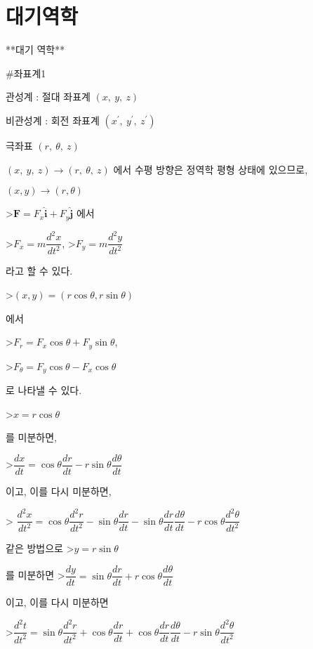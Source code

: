\section{대기역학 }

\pagestyle{headings}


**대기 역학**


#좌표계1

관성계 : 절대 좌표계 $ (x,~y,~z)$

비관성계 : 회전 좌표계 $ (x^{\prime},~y^{\prime},~z^{\prime})$ 

극좌표 $ (r,~\theta,~z)$


$ (x,~y,~z) 	\rightarrow (r,~\theta,~z)$ 
에서 수평 방향은 정역학 평형 상태에 있으므로, 

$ (x, y) 	\rightarrow (r, \theta)$

>$ \mathbf{F} = F_{x} \mathbf{\hat{i}}  + F_{y} \mathbf{\hat{j}} $ 
에서 

>$ F_{x} = m \dfrac{d^{2}x}{dt^{2}}$, 
>$ F_{y} = m \dfrac{d^{2}y}{dt^{2}}$ 

라고 할 수 있다. 

>$ (x, y) = (r \cos \theta, r \sin \theta)$ 

에서

>$ F_{r} = F_{x} \cos \theta + F_{y} \sin \theta $, 

>$ F_{\theta} = F_{y} \cos \theta - F_{x} \cos \theta $ 

로 나타낼 수 있다. 

>$ x = r \cos \theta $

를 미분하면, 

>$\dfrac{dx}{dt} = \cos \theta \dfrac{dr}{dt} - r \sin \theta \dfrac{d\theta}{dt}$ 

이고, 이를 다시 미분하면, 

> $\dfrac{d^{2}x}{dt^{2}} = \cos \theta \dfrac{d^{2}r}{dt^{2}} - \sin \theta \dfrac{dr}{dt} - \sin \theta \dfrac{dr}{dt} \dfrac{d\theta}{dt} -r \cos \theta \dfrac{d^{2}\theta}{dt^{2}}$

같은 방법으로 
>$ y = r \sin \theta $ 

를 미분하면
>$\dfrac{dy}{dt} = \sin \theta \dfrac{dr}{dt} + r \cos \theta \dfrac{d\theta}{dt}$ 

이고, 이를 다시 미분하면

>$\dfrac{d^{2}t}{dt^{2}} = \sin \theta \dfrac{d^{2}r}{dt^{2}} + \cos \theta \dfrac{dr}{dt} + \cos \theta \dfrac{dr}{dt} \dfrac{d\theta}{dt} -r \sin \theta \dfrac{d^{2}\theta}{dt^{2}}$

